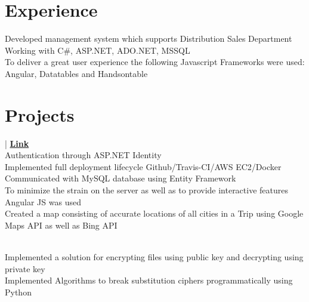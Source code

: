 \documentclass[]{Resume}
\begin{document}
\hfill
\begin{minipage}[t]{0.66\textwidth} 


\section{Experience}
\textbullet{} Developed management system which supports Distribution Sales Department \\
\textbullet {} Working with C\#, ASP.NET, ADO.NET, MSSQL \\
\textbullet{} To deliver a great user experience the following Javascript Frameworks were used:  Angular, Datatables and Handsontable \\
\sectionsep



\section{Projects}
 | \href{https://github.com/Cushionyten0/TheWorld/}{\bf Link} \\
\textbullet{} Authentication through ASP.NET Identity \\
\textbullet{} Implemented full deployment lifecycle Github/Travis-CI/AWS EC2/Docker \\
\textbullet{} Communicated with MySQL database using Entity Framework \\
\textbullet{} To minimize the strain on the server as well as to provide interactive features Angular JS was used \\
\textbullet{} Created a map consisting of accurate locations of all cities in a Trip using Google Maps API as well as Bing API

\sectionsep

 \\
\textbullet{} Implemented a solution for encrypting files using public key and decrypting using private key \\
\textbullet{} Implemented Algorithms to break substitution ciphers programmatically using Python  


\end{minipage}
\end{document}
